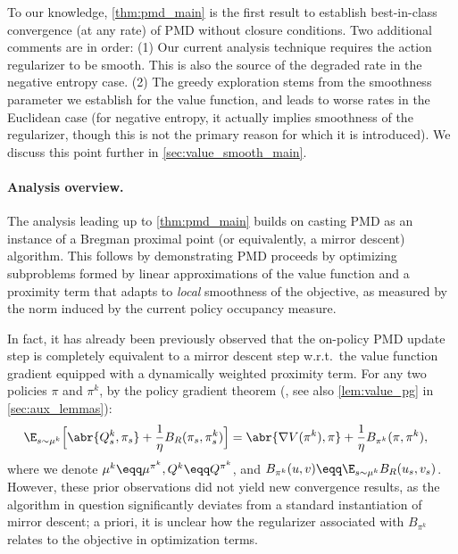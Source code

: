 To our knowledge, \cref{thm:pmd_main} is the first result to establish best-in-class convergence (at any rate) of PMD without closure conditions. Two additional comments are in order:
(1) Our current analysis technique requires the action regularizer to be smooth. This is also the source of the degraded rate in the negative entropy case.
(2) The greedy exploration stems from the smoothness parameter we establish for the value function, and leads to worse rates in the Euclidean case (for negative entropy, it actually implies smoothness of the regularizer, though this is not the primary reason for which it is introduced). We discuss this point further in \cref{sec:value_smooth_main}.

\paragraph{Analysis overview.}
The analysis leading up to \cref{thm:pmd_main} builds on casting PMD as an instance of a Bregman proximal point (or equivalently, a mirror descent) algorithm. This follows by demonstrating PMD proceeds by optimizing subproblems formed by linear approximations of the value function and a proximity term that adapts to \emph{local} smoothness of the objective, as measured by the norm induced by the current policy occupancy measure.


In fact, it has already been previously observed \citep[e.g.,][]{shani2020adaptive, xiao2022convergence} that the on-policy PMD update step is completely equivalent to a mirror descent step w.r.t.~the value function gradient equipped with a dynamically weighted proximity term. For any two policies $\pi$ and $\pi^k$, by the policy gradient theorem (\citealp{sutton1999policy}, see also \cref{lem:value_pg} in \cref{sec:aux_lemmas}):
\begin{align}\label{eq:pmd_omd_equiv}
    \E_{s \sim \mu^{k}}\Big[
        &\abr{Q^{k}_s, \pi_s} 
        + \frac1\eta B_R(\pi_s, \pi_s^k)
    \Big]
    =
        \abr{\nabla V(\pi^k), \pi} 
        + \frac1\eta B_{\pi^k}(\pi, \pi^k),
\end{align}
where we denote $\mu^k \eqq \mu^{\pi^k}, Q^k \eqq Q^{\pi^k}$, and $B_{\pi^k}(u, v) \eqq \E_{s \sim \mu^k}B_R(u_s, v_s)$. 
However, these prior observations did not yield new convergence results, as the algorithm in question significantly deviates from a standard instantiation of mirror descent; a priori, it is unclear how the regularizer associated with $B_{\pi^k}$ relates to the objective in optimization terms.

